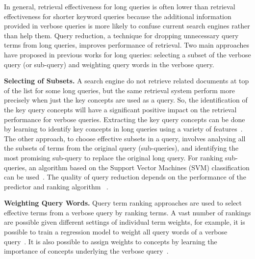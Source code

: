 In general, retrieval effectiveness for long queries is often lower than retrieval effectiveness for shorter keyword queries because the additional information provided in verbose queries is more likely to confuse current search engines rather than help them. Query reduction, a technique for dropping unnecessary query terms from long queries, improves performance of retrieval. Two main approaches have proposed in previous works for long queries: selecting a subset of the verbose query (or sub-query) and weighting query words in the verbose query. 
\begin{list}{-}{}

\item \textbf{Selecting of Subsets.} 
A search engine do not retrieve related documents at top of the list for some long queries, but the same retrieval system perform more precisely when just the key concepts are used as a query. So, the identification of the key query concepts will have a significant positive impact on the retrieval performance for verbose queries. Extracting the key query concepts can be done by learning to identify key concepts in long queries using a variety of features~\citep{bendersky2008discovering}. The other approach, to choose effective subsets in a query, involves analysing all the subsets of terms from the original query (sub-queries), and identifying the most promising sub-query to replace the original long query. For ranking sub-queries, an algorithm based on the Support Vector Machines (SVM) classification can be used~\citep{kumaran2009reducing}. The quality of query reduction depends on the performance of the predictor and ranking algorithm ~\citep{balasubramanian2010exploring}.

\item \textbf{Weighting Query Words.}
Query term ranking approaches are used to select effective terms from a verbose query by ranking terms. A vast number of rankings are possible given different settings of individual term weights, for example, it is possible to train a regression model to weight all query words of a verbose query~\citep{lease2009regression}. It is also possible to assign weights to concepts by learning the importance of concepts underlying
the verbose query~\citep{bendersky2010learning}.

\end{list}
